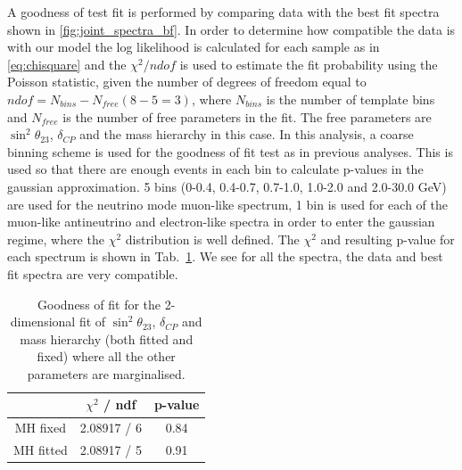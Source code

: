 



A goodness of test fit is performed by comparing data with the best fit spectra shown in \cref{fig:joint_spectra_bf}.
In order to determine how compatible the data is with our model 
the log likelihood is calculated for each sample as in \cref{eq:chisquare}
and the $\chi^2 / ndof$ is used to estimate the fit probability using the Poisson statistic, 
given the number of degrees of freedom equal to $ndof = N_{bins} - N_{free} (8-5 = 3)$,
where $N_{bins}$ is the number of template bins and $N_{free}$ is the number of free parameters in the fit.
The free parameters are $\sin^2 \theta_{23}$, $\delta_{CP}$ and the mass hierarchy in this case. 
In this analysis, a coarse binning scheme is used for the goodness of fit test as in previous analyses. 
This is used so that there are enough events in each bin to calculate p-values in the gaussian approximation. 
5 bins (0-0.4, 0.4-0.7, 0.7-1.0, 1.0-2.0 and 2.0-30.0 GeV) are used for the neutrino mode muon-like spectrum, 
1 bin is used for each of the muon-like antineutrino and electron-like spectra
in order to enter the gaussian regime, where the $\chi^2$ distribution is well defined.
The $\chi^2$ and resulting p-value for each spectrum is shown in Tab.~\ref{tab:goodness_of_fit}. 
We see for all the spectra, the data and best fit spectra are very compatible.

\begin{table}[htb]
\centering
\begin{tabular}{| c | c | c |}
\hline
 			& $\chi^2$ / ndf        		& p-value \\ \hline
MH fixed 		& 2.08917 / 6                  	& 0.84	\\ \hline
MH fitted 		& 2.08917 / 5                  	& 0.91	\\ \hline

\end{tabular}
\caption{
Goodness of fit for the 2-dimensional fit of $\sin^2 \theta_{23}$, $\delta_{CP}$ and mass hierarchy 
(both fitted and fixed)
where all the other parameters are marginalised. 
}
\label{tab:goodness_of_fit}
\end{table}










